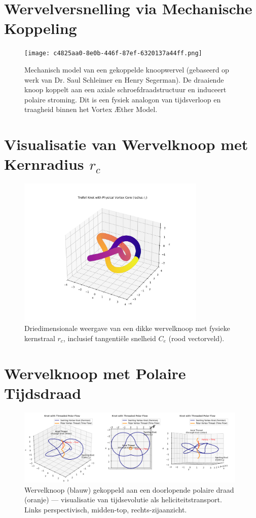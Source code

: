 \documentclass{article}
\begin{document}
    \section*{Wervelversnelling via Mechanische Koppeling}
    \begin{figure}[h!]
        \centering
        \texttt{[image: c4825aa0-8e0b-446f-87ef-6320137a44ff.png]}
        \caption{Mechanisch model van een gekoppelde knoopwervel (gebaseerd op werk van Dr. Saul Schleimer en Henry Segerman). De draaiende knoop koppelt aan een axiale schroefdraadstructuur en induceert polaire stroming. Dit is een fysiek analogon van tijdsverloop en traagheid binnen het Vortex \AE ther Model.}
    \end{figure}

    \section*{Visualisatie van Wervelknoop met Kernradius $r_c$}
    \begin{figure}[h!]
        \centering
        \includegraphics[width=0.8\textwidth]{FatTreFoil.png}
        \caption{Driedimensionale weergave van een dikke wervelknoop met fysieke kernstraal $r_c$, inclusief tangentiële snelheid $C_e$ (rood vectorveld).}
    \end{figure}

    \section*{Wervelknoop met Polaire Tijdsdraad}
    \begin{figure}[h!]
        \centering
        \includegraphics[width=0.98\textwidth]{KnotThreadedPolarFlow.png}
        \caption{Wervelknoop (blauw) gekoppeld aan een doorlopende polaire draad (oranje) — visualisatie van tijdsevolutie als heliciteitstransport. Links perspectivisch, midden-top, rechts-zijaanzicht.}
    \end{figure}
\end{document}
